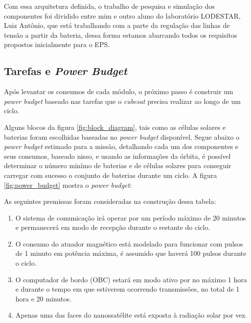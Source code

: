 Com essa arquitetura definida, o trabalho de pesquisa e simulação dos componentes foi dividido entre mim e outro aluno do laboratório LODESTAR, Luiz Antônio, que está trabalhando com a parte da regulação das linhas de tensão a partir da bateria, dessa forma estamos abarcando todos os requisitos propostos inicialmente para o EPS.

\subsection*{Tarefas e \textit{Power Budget}}

Após levantar os consumos de cada módulo, o próximo passo é construir um \textit{power budget} baseado nas tarefas que o \textit{cubesat} precisa realizar ao longo de um ciclo.  

Alguns blocos da figura \ref{fig:block_diagram}, tais como as células solares e baterias foram escolhidas baseadas no \textit{power budget} disponível. Segue abaixo o \textit{power budget} estimado para a missão, detalhando cada um dos componentes e seus consumos, baseado nisso, e usando as informações da órbita, é possível determinar o número minímo de baterias e de células solares para conseguir carregar com sucesso o conjunto de baterias durante um ciclo. A figura \ref{fig:power_budget} mostra o \textit{power budget}:

\noindent
\begin{minipage}{\linewidth}
\label{fig:power_budget}
\end{minipage}

As seguintes premissas foram consideradas na construção dessa tabela:

\begin{enumerate}
    \item O sistema de comunicação irá operar por um período máximo de 20 minutos e permanecerá em modo de recepção durante o restante do ciclo.
    \item O consumo do atuador magnético está modelado para funcionar com pulsos de 1 minuto em potência máxima, é assumido que haverá 100 pulsos durante o ciclo.
    \item O computador de bordo (OBC) estará em modo ativo por no máximo 1 hora e durante o tempo em que estiverem ocorrendo transmissões, no total de 1 hora e 20 minutos.
    \item Apenas uma das faces do nanossatélite está exposta à radiação solar por vez.
\end{enumerate}


